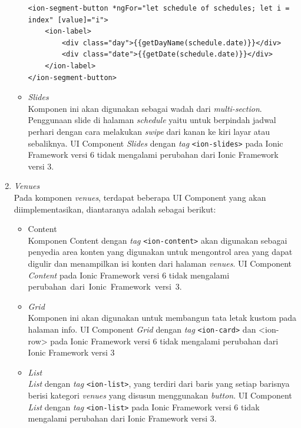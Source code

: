 \begin{enumerate}
\begin{itemize}
\begin{lstlisting}[label={lst:segmentScheduleWSDCNew}, caption=\textit{Tag} <ion-segment-button> dengan Ionic 6 di Aplikasi WSDC 2017 Bali yang Akan Dibuat]
<ion-segment-button *ngFor="let schedule of schedules; let i = index" [value]="i">
	<ion-label>
		<div class="day">{{getDayName(schedule.date)}}</div>
		<div class="date">{{getDate(schedule.date)}}</div>
	</ion-label>
</ion-segment-button>
\end{lstlisting}
			
			\item \textit{Slides} \\
		Komponen ini akan digunakan sebagai wadah dari \textit{multi-section}. Penggunaan slide di halaman \textit{schedule} yaitu untuk berpindah jadwal perhari dengan cara melakukan \textit{swipe} dari kanan ke kiri layar atau sebaliknya. UI Component \textit{Slides} dengan \textit{tag} \texttt{<ion-slides>} pada Ionic Framework versi 6 tidak mengalami perubahan dari Ionic Framework versi 3.
			
		\end{itemize}
		
	\item \textit{Venues}\\
	Pada komponen \textit{venues}, terdapat beberapa UI Component yang akan diimplementasikan, diantaranya adalah sebagai berikut:
		\begin{itemize}
			\item Content \\
		Komponen Content dengan \textit{tag} \texttt{<ion-content>} akan digunakan sebagai penyedia area konten yang digunakan untuk mengontrol area yang dapat digulir dan menampilkan isi konten dari halaman \textit{venues}. UI Component \textit{Content} pada Ionic Framework versi 6 tidak mengalami perubahan~dari~Ionic~Framework~versi~3.
		
			\item \textit{Grid} \\
		Komponen ini akan digunakan untuk membangun tata letak kustom pada halaman info. UI Component \textit{Grid} dengan \textit{tag} \texttt{<ion-card>} dan {<ion-row>} pada Ionic Framework versi 6 tidak mengalami perubahan dari Ionic Framework versi 3

			\item \textit{List} \\
		\textit{List} dengan \textit{tag} \texttt{<ion-list>}, yang terdiri dari baris yang setiap barisnya berisi kategori \textit{venues} yang disusun menggunakan \textit{button}. UI Component \textit{List} dengan \textit{tag} \texttt{<ion-list>} pada Ionic Framework versi 6 tidak mengalami perubahan dari Ionic Framework versi 3.
		

\end{itemize}
\end{enumerate}
